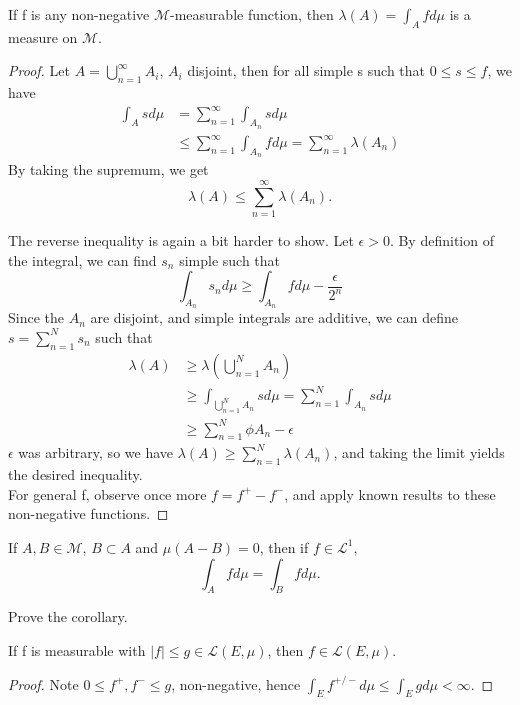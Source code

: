 \documentclass[11pt]{scrartcl}
\begin{document}
\begin{theorem}
If f is any non-negative $\mathcal{M}$-measurable function, then $\lambda(A) = \int_A f d\mu $ is a measure on $\mathcal{M}$.
\end{theorem}
\begin{proof}
Let $A = \bigcup_{n=1}^\infty A_i$, $A_i$ disjoint, then for all simple s such that $0\leq s\leq f$, we have 
\begin{align*}
\int_A s d\mu & = \sum_{n = 1}^{\infty} \int_{A_n} s d\mu \\
& \leq \sum_{n = 1}^{\infty} \int_{A_n} f d\mu =  \sum_{n = 1}^{\infty} \lambda(A_n)
\end{align*}
By taking the supremum, we get $$\lambda(A)\leq \sum_{n = 1}^{\infty} \lambda(A_n).$$

The reverse inequality is again a bit harder to show. Let $\epsilon>0$. By definition of the integral, we can find $s_n$ simple such that 
$$ \int_{A_n} s_n d\mu \geq \int_{A_n} f d\mu - \frac{\epsilon}{2^n}$$
Since the $A_n$ are disjoint, and simple integrals are additive, we can define $s = \sum_{n=1}^N s_n$ such that
\begin{align*}
\lambda(A) & \geq \lambda(\bigcup_{n=1}^N A_n) \\
& \geq \int_{\bigcup_{n=1}^N A_n} s d\mu = \sum_{n=1}^N \int_{A_n} s d\mu \\
& \geq \sum_{n=1}^N \phi{A_n} - \epsilon
\end{align*} 
$\epsilon$ was arbitrary, so we have $\lambda(A) \geq \sum_{n=1}^N \lambda(A_n)$, and taking the limit yields the desired inequality.\\
For general f, observe once more $f = f^+ - f^-$, and apply known results to these non-negative functions.
\end{proof}

\begin{corollary}
If $A,B\in \mathcal{M}$, $B\subset A$ and $\mu(A - B) = 0$, then if $f \in \mathscr{L}^1$, 
$$\int_A f d\mu = \int_B f d\mu. $$
\end{corollary}

\begin{exercise}
Prove the corollary.
\end{exercise}

\begin{theorem}
If f is measurable with $|f| \leq g \in \mathscr{L}(E,\mu)$, then $f \in \mathscr{L}(E,\mu)$.
\end{theorem}
\begin{proof}
Note $0 \leq f^+,f^- \leq g$, non-negative, hence $\int_{E} f^{+/-} d\mu \leq \int_{E} g d\mu < \infty$. 
\end{proof}
\end{document}
